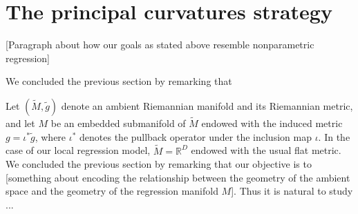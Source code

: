 \documentclass[11pt]{article}
\newcommand{\R}{\ensuremath{\mathbb{R}}}
\numberwithin{equation}{section}
\begin{document}
\section{The principal curvatures strategy}


[Paragraph about how our goals as stated above resemble nonparametric regression]

We concluded the previous section by remarking that 



Let $(\tilde{M}, \tilde{g})$ denote an ambient Riemannian manifold and its Riemannian metric, and let $M$ be an embedded submanifold of $\tilde{M}$ endowed with the induced metric $g = \iota^{*} \tilde{g}$, where $\iota^*$ denotes the pullback operator under the inclusion map $\iota$. In the case of our local regression model, $\tilde{M} = \R^D$ endowed with the usual flat metric. We concluded the previous section by remarking that our objective is to [something about encoding the relationship between the geometry of the ambient space and the geometry of the regression manifold $M$]. Thus it is natural to study ...
\end{document}
